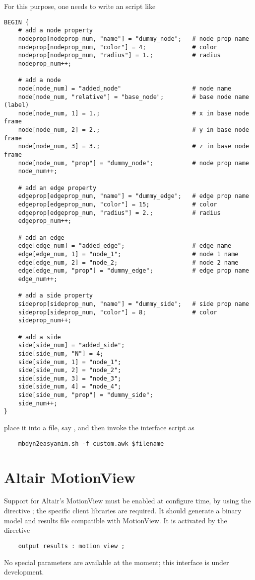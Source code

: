 For this purpose, one needs to write an  script like
\begin{verbatim}
BEGIN {
    # add a node property
    nodeprop[nodeprop_num, "name"] = "dummy_node";   # node prop name
    nodeprop[nodeprop_num, "color"] = 4;             # color
    nodeprop[nodeprop_num, "radius"] = 1.;           # radius
    nodeprop_num++;

    # add a node
    node[node_num] = "added_node"                    # node name
    node[node_num, "relative"] = "base_node";        # base node name (label)
    node[node_num, 1] = 1.;                          # x in base node frame
    node[node_num, 2] = 2.;                          # y in base node frame
    node[node_num, 3] = 3.;                          # z in base node frame
    node[node_num, "prop"] = "dummy_node";           # node prop name
    node_num++;

    # add an edge property
    edgeprop[edgeprop_num, "name"] = "dummy_edge";   # edge prop name
    edgeprop[edgeprop_num, "color"] = 15;            # color
    edgeprop[edgeprop_num, "radius"] = 2.;           # radius
    edgeprop_num++;

    # add an edge
    edge[edge_num] = "added_edge";                   # edge name
    edge[edge_num, 1] = "node_1";                    # node 1 name
    edge[edge_num, 2] = "node_2;                     # node 2 name
    edge[edge_num, "prop"] = "dummy_edge";           # edge prop name
    edge_num++;

    # add a side property
    sideprop[sideprop_num, "name"] = "dummy_side";   # side prop name
    sideprop[sideprop_num, "color"] = 8;             # color
    sideprop_num++;

    # add a side
    side[side_num] = "added_side";
    side[side_num, "N"] = 4;
    side[side_num, 1] = "node_1";
    side[side_num, 2] = "node_2";
    side[side_num, 3] = "node_3";
    side[side_num, 4] = "node_4";
    side[side_num, "prop"] = "dummy_side";
    side_num++;
}
\end{verbatim}
place it into a file, say ,
and then invoke the interface script as
\begin{verbatim}
    mbdyn2easyanim.sh -f custom.awk $filename
\end{verbatim}



\section{Altair MotionView}
Support for Altair's MotionView must be enabled at configure time, 
by using the directive ;
the specific client libraries are required.
It should generate a binary model and results file compatible
with MotionView.
It is activated by the directive
\begin{verbatim}
    output results : motion view ;
\end{verbatim}
No special parameters are available at the moment; 
this interface is under development.


